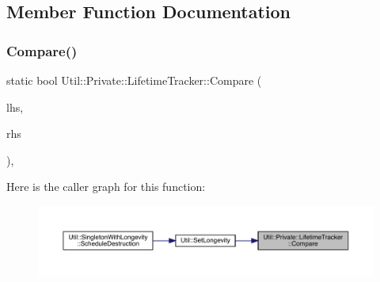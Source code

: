 \subsection{Member Function Documentation}
\mbox{\label{classUtil_1_1Private_1_1LifetimeTracker_aa24d4865c53c4f962183ce31276efd7c}} 
\subsubsection{\texorpdfstring{Compare()}{Compare()}\hspace{0.1cm}{\footnotesize\ttfamily [1/2]}}
{\footnotesize\ttfamily static bool Util\+::\+Private\+::\+Lifetime\+Tracker\+::\+Compare (\begin{DoxyParamCaption}\item[{const \mbox{\hyperlink{classUtil_1_1Private_1_1LifetimeTracker}{Lifetime\+Tracker}} $\ast$}]{lhs,  }\item[{const \mbox{\hyperlink{classUtil_1_1Private_1_1LifetimeTracker}{Lifetime\+Tracker}} $\ast$}]{rhs }\end{DoxyParamCaption})\hspace{0.3cm}{\ttfamily [inline]}, {\ttfamily [static]}}

Here is the caller graph for this function\+:\nopagebreak
\begin{figure}[H]
\begin{center}
\leavevmode
\includegraphics[width=350pt]{d4/daa/classUtil_1_1Private_1_1LifetimeTracker_aa24d4865c53c4f962183ce31276efd7c_icgraph}
\end{center}
\end{figure}
\mbox{\label{classUtil_1_1Private_1_1LifetimeTracker_aa24d4865c53c4f962183ce31276efd7c}} 
